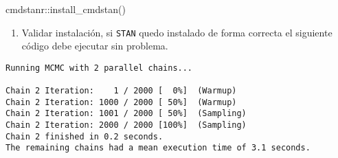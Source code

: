 \documentclass[
  letterpaper,
  DIV=11,
  numbers=noendperiod]{scrartcl}
\newenvironment{Shaded}{\begin{snugshade}}{\end{snugshade}}
\newcommand{\AttributeTok}[1]{\textcolor[rgb]{0.40,0.45,0.13}{#1}}
\newcommand{\CommentTok}[1]{\textcolor[rgb]{0.37,0.37,0.37}{#1}}
\newcommand{\DecValTok}[1]{\textcolor[rgb]{0.68,0.00,0.00}{#1}}
\newcommand{\FunctionTok}[1]{\textcolor[rgb]{0.28,0.35,0.67}{#1}}
\newcommand{\NormalTok}[1]{\textcolor[rgb]{0.00,0.23,0.31}{#1}}
\newcommand{\OtherTok}[1]{\textcolor[rgb]{0.00,0.23,0.31}{#1}}
\newcommand{\SpecialCharTok}[1]{\textcolor[rgb]{0.37,0.37,0.37}{#1}}
\newcommand{\StringTok}[1]{\textcolor[rgb]{0.13,0.47,0.30}{#1}}
\providecommand{\tightlist}{%
  \setlength{\itemsep}{0pt}\setlength{\parskip}{0pt}}\usepackage{longtable,booktabs,array}
\begin{document}
\begin{Shaded}
\begin{Highlighting}[]
\NormalTok{cmdstanr}\SpecialCharTok{::}\FunctionTok{install\_cmdstan}\NormalTok{() }
\end{Highlighting}
\end{Shaded}

\begin{enumerate}
\def\labelenumi{\arabic{enumi}.}
\setcounter{enumi}{2}
\tightlist
\item
  Validar instalación, si \texttt{STAN} quedo instalado de forma
  correcta el siguiente código debe ejecutar sin problema.
\end{enumerate}

\begin{Shaded}
\end{Shaded}

\begin{verbatim}
Running MCMC with 2 parallel chains...

Chain 2 Iteration:    1 / 2000 [  0%]  (Warmup) 
Chain 2 Iteration: 1000 / 2000 [ 50%]  (Warmup) 
Chain 2 Iteration: 1001 / 2000 [ 50%]  (Sampling) 
Chain 2 Iteration: 2000 / 2000 [100%]  (Sampling) 
Chain 2 finished in 0.2 seconds.
The remaining chains had a mean execution time of 3.1 seconds.
\end{verbatim}
\end{document}
